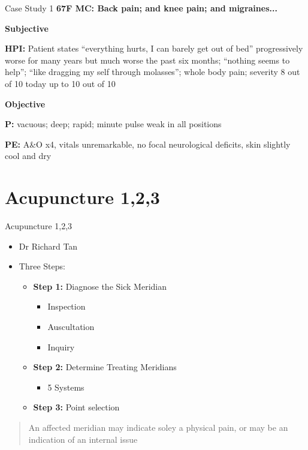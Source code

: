 \begin{frame}{Case Study 1}
  \textbf{\Large 67F MC: Back pain; and knee pain; and migraines...}
  
  \textbf{\large Subjective}
  
  \textbf{HPI:} Patient states ``everything hurts, I can barely get out of bed'' progressively worse for many years but much worse the past six months; ``nothing seems to help''; ``like dragging my self through molasses''; whole body pain; severity 8 out of 10 today up to 10 out of 10

  \textbf{\large Objective}
  
  \textbf{P:} vacuous; deep; rapid; minute pulse weak in all positions

  \textbf{PE:} A\&O x4, vitals unremarkable, no focal neurological deficits, skin slightly cool and dry

\end{frame}

\section{Acupuncture 1,2,3}

\begin{frame}{Acupuncture 1,2,3}
  \begin{itemize}
  \item Dr Richard Tan
  \item Three Steps:
    \begin{itemize} \itemsep1em
    \item \textbf{Step 1:} Diagnose the Sick Meridian
      \begin{itemize}
      \item Inspection
      \item Auscultation
      \item Inquiry
      \end{itemize}
    \item \textbf{Step 2:} Determine Treating Meridians
      \begin{itemize}
      \item{5 Systems}
      \end{itemize}
    \item \textbf{Step 3:} Point selection
    \end{itemize}
  \end{itemize}

  \begin{quote}
    An affected meridian may indicate soley a physical pain, or may be an indication of an internal issue
  \end{quote}
\end{frame}

